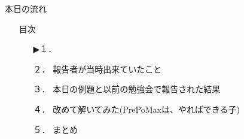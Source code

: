 \begin{frame}{本日の流れ}
  \begin{itemize}
     \item[] 目次
     \begin{itemize}[itemsep=1.3ex, leftmargin=1cm]
        \item[▶１．] 
        \item[２．] 報告者が当時出来ていたこと
        \item[３．] 本日の例題と以前の勉強会で報告された結果
        \item[４．] 改めて解いてみた(PrePoMaxは、やればできる子)
        \item[５．] まとめ
     \end{itemize}
  \end{itemize}
\end{frame}
